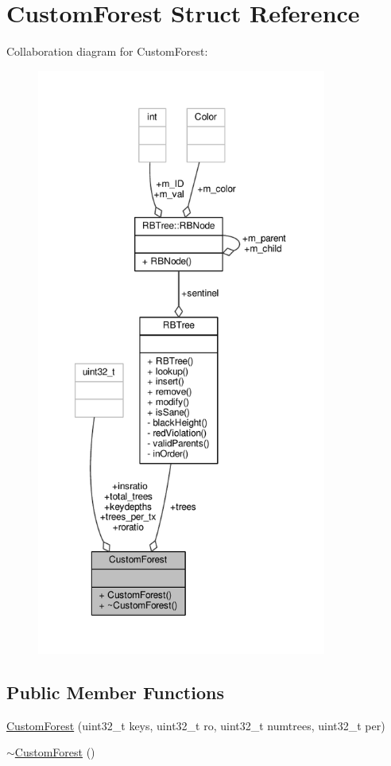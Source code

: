 \hypertarget{structCustomForest}{\section{Custom\-Forest Struct Reference}
\label{structCustomForest}
}


Collaboration diagram for Custom\-Forest\-:
\nopagebreak
\begin{figure}[H]
\begin{center}
\leavevmode
\includegraphics[height=550pt]{structCustomForest__coll__graph}
\end{center}
\end{figure}
\subsection*{Public Member Functions}
\begin{DoxyCompactItemize}
\item 
\hyperlink{structCustomForest_ad44371ca2d5043de9a084343cb02dcf9}{Custom\-Forest} (uint32\-\_\-t keys, uint32\-\_\-t ro, uint32\-\_\-t numtrees, uint32\-\_\-t per)
\item 
\hyperlink{structCustomForest_a55f34066a69ac53eafeddb0dc3779245}{$\sim$\-Custom\-Forest} ()
\end{DoxyCompactItemize}
